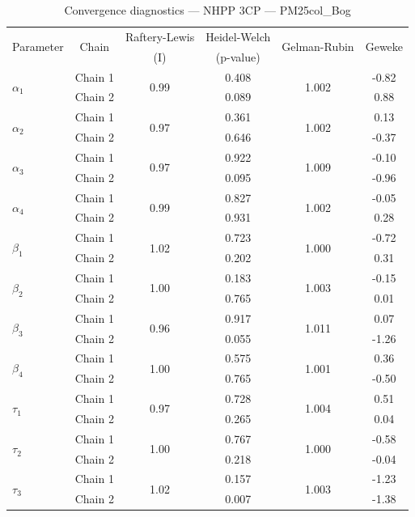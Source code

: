 \begin{table}[H]
\centering
\caption{Convergence diagnostics — NHPP 3CP — PM25col_Bog}
\begin{tabular}{lccccc}
\toprule
\multirow{2}{*}{Parameter} & \multirow{2}{*}{Chain} & Raftery-Lewis & Heidel-Welch & \multirow{2}{*}{Gelman-Rubin} & \multirow{2}{*}{Geweke} \\
 & & (I) & (p-value) & & (z) \\
\midrule
\multirow{2}{*}{$\alpha_1$} & Chain 1 & \multirow{2}{*}{0.99} & 0.408 & \multirow{2}{*}{1.002} & -0.82 \\
 & Chain 2 & & 0.089 & & 0.88 \\
\multirow{2}{*}{$\alpha_2$} & Chain 1 & \multirow{2}{*}{0.97} & 0.361 & \multirow{2}{*}{1.002} & 0.13 \\
 & Chain 2 & & 0.646 & & -0.37 \\
\multirow{2}{*}{$\alpha_3$} & Chain 1 & \multirow{2}{*}{0.97} & 0.922 & \multirow{2}{*}{1.009} & -0.10 \\
 & Chain 2 & & 0.095 & & -0.96 \\
\multirow{2}{*}{$\alpha_4$} & Chain 1 & \multirow{2}{*}{0.99} & 0.827 & \multirow{2}{*}{1.002} & -0.05 \\
 & Chain 2 & & 0.931 & & 0.28 \\
\midrule
\multirow{2}{*}{$\beta_1$} & Chain 1 & \multirow{2}{*}{1.02} & 0.723 & \multirow{2}{*}{1.000} & -0.72 \\
 & Chain 2 & & 0.202 & & 0.31 \\
\multirow{2}{*}{$\beta_2$} & Chain 1 & \multirow{2}{*}{1.00} & 0.183 & \multirow{2}{*}{1.003} & -0.15 \\
 & Chain 2 & & 0.765 & & 0.01 \\
\multirow{2}{*}{$\beta_3$} & Chain 1 & \multirow{2}{*}{0.96} & 0.917 & \multirow{2}{*}{1.011} & 0.07 \\
 & Chain 2 & & 0.055 & & -1.26 \\
\multirow{2}{*}{$\beta_4$} & Chain 1 & \multirow{2}{*}{1.00} & 0.575 & \multirow{2}{*}{1.001} & 0.36 \\
 & Chain 2 & & 0.765 & & -0.50 \\
\midrule
\multirow{2}{*}{$\tau_1$} & Chain 1 & \multirow{2}{*}{0.97} & 0.728 & \multirow{2}{*}{1.004} & 0.51 \\
 & Chain 2 & & 0.265 & & 0.04 \\
\multirow{2}{*}{$\tau_2$} & Chain 1 & \multirow{2}{*}{1.00} & 0.767 & \multirow{2}{*}{1.000} & -0.58 \\
 & Chain 2 & & 0.218 & & -0.04 \\
\multirow{2}{*}{$\tau_3$} & Chain 1 & \multirow{2}{*}{1.02} & 0.157 & \multirow{2}{*}{1.003} & -1.23 \\
 & Chain 2 & & 0.007 & & -1.38 \\
\bottomrule
\end{tabular}
\end{table}
